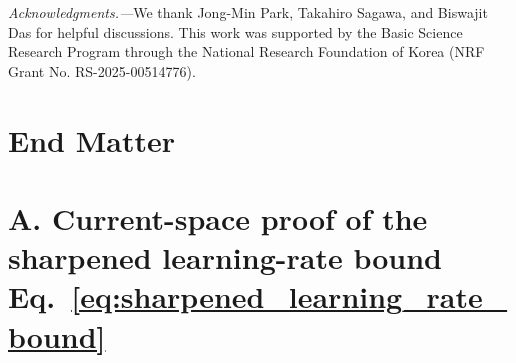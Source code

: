 \documentclass[
 longbibliography,
 twocolumn,
 superscriptaddress,
 amsmath,
 amssymb,
 amsthm,
 amsfonts,
 prl,
 floatfix,
]{revtex4-2}
\newcommand{\matbf}[1]{\boldsymbol{\mathsf{#1}}}
\begin{document}

\begin{acknowledgments}
\textit{Acknowledgments.---}We thank Jong-Min Park, Takahiro Sagawa, and Biswajit Das for helpful discussions. This work was supported by the Basic Science Research Program through the National Research Foundation of Korea (NRF Grant No. RS-2025-00514776).

\end{acknowledgments}



\makeatletter
\let\saved@hangfrom@section\@hangfrom@section
\let\saved@sectioncntformat\@sectioncntformat
\let\saved@thesection\thesection
\let\saved@thesubsection\thesubsection
\let\saved@thesubsubsection\thesubsubsection
\let\saved@cl@section\cl@section
\let\saved@theequation@prefix\theequation@prefix
{}
\makeatother

\appendix*
\section*{End Matter}

\section{A. Current-space proof of the sharpened learning-rate bound Eq.~\eqref{eq:sharpened_learning_rate_bound}}
\end{document}
